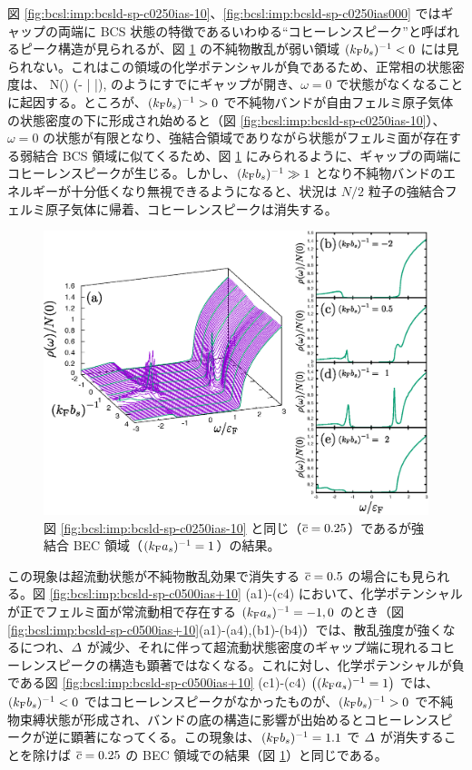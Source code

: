 図 \ref{fig:bcsl:imp:bcsld-sp-c0250ias-10}、\ref{fig:bcsl:imp:bcsld-sp-c0250ias000} ではギャップの両端に BCS 状態の特徴であるいわゆる“コヒーレンスピーク”と呼ばれるピーク構造が見られるが、図 \ref{fig:bcsl:imp:bcsld-sp-c0250ias+10} の不純物散乱が弱い領域 $(k_{\text{F}} b_s)^{-1}<0$ には見られない。これはこの領域の化学ポテンシャルが負であるため、正常相の状態密度は、
\beq
N(\omega) \propto \sqrt{\omega-|\cpt|} \theta(\omega- | \cpt|),
\eeq
のようにすでにギャップが開き、$\omega=0$ で状態がなくなることに起因する。ところが、$(k_{\text{F}} b_s)^{-1}>0$ で不純物バンドが自由フェルミ原子気体の状態密度の下に形成され始めると（図 \ref{fig:bcsl:imp:bcsld-sp-c0250ias-10}）、$\omega=0$ の状態が有限となり、強結合領域でありながら状態がフェルミ面が存在する弱結合 BCS 領域に似てくるため、図 \ref{fig:bcsl:imp:bcsld-sp-c0250ias+10} にみられるように、ギャップの両端にコヒーレンスピークが生じる。しかし、$(k_{\text{F}} b_s)^{-1}\gg1$ となり不純物バンドのエネルギーが十分低くなり無視できるようになると、状況は $N/2$ 粒子の強結合フェルミ原子気体に帰着、コヒーレンスピークは消失する。

\clearpage
\begin{figure}[t]
\centering
\includegraphics[width=130mm]{eps/bcsl-dos-sp-c0250-ias+10.eps}
\caption{図 \ref{fig:bcsl:imp:bcsld-sp-c0250ias-10} と同じ（$\overline{c}=0.25$）であるが強結合 BEC 領域（$(k_{\text{F}} a_s)^{-1}=1$）の結果。}
\label{fig:bcsl:imp:bcsld-sp-c0250ias+10}
\end{figure}

この現象は超流動状態が不純物散乱効果で消失する $\overline{c}=0.5$ の場合にも見られる。図 \ref{fig:bcsl:imp:bcsld-sp-c0500ias+10} (a1)-(c4) において、化学ポテンシャルが正でフェルミ面が常流動相で存在する $(k_{\text{F}} a_s)^{-1}=-1, 0$ のとき（図 \ref{fig:bcsl:imp:bcsld-sp-c0500ias+10}(a1)-(a4),(b1)-(b4)）では、散乱強度が強くなるにつれ、$\varDelta$ が減少、それに伴って超流動状態密度のギャップ端に現れるコヒーレンスピークの構造も顕著ではなくなる。これに対し、化学ポテンシャルが負である図 \ref{fig:bcsl:imp:bcsld-sp-c0500ias+10} (c1)-(c4) $\left((k_{\text{F}} a_s)^{-1}=1\right)$ では、$(k_{\text{F}} b_s)^{-1}<0$ ではコヒーレンスピークがなかったものが、$(k_{\text{F}} b_s)^{-1}>0$ で不純物束縛状態が形成され、バンドの底の構造に影響が出始めるとコヒーレンスピークが逆に顕著になってくる。この現象は、$(k_{\text{F}} b_s)^{-1}=1.1$ で $\varDelta$ が消失することを除けば $\overline{c}=0.25$ の BEC 領域での結果（図 \ref{fig:bcsl:imp:bcsld-sp-c0250ias+10}）と同じである。

